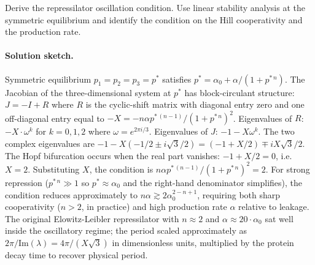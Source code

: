 \begin{exercise}
Derive the repressilator oscillation condition. Use linear stability
analysis at the symmetric equilibrium and identify the condition on
the Hill cooperativity and the production rate.

\paragraph{Solution sketch.}
Symmetric equilibrium $p_{1} = p_{2} = p_{3} = p^{*}$ satisfies
$p^{*} = \alpha_{0} + \alpha/(1 + p^{*\,n})$. The Jacobian of the
three-dimensional system at $p^{*}$ has block-circulant structure:
$J = -I + R$ where $R$ is the cyclic-shift matrix with diagonal
entry zero and one off-diagonal entry equal to
$-X = -n \alpha p^{*\,(n-1)}/(1 + p^{*\,n})^{2}$. Eigenvalues of
$R$: $-X \cdot \omega^{k}$ for $k = 0, 1, 2$ where
$\omega = e^{2\pi i/3}$. Eigenvalues of $J$: $-1 - X \omega^{k}$.
The two complex eigenvalues are $-1 - X(-1/2 \pm i\sqrt{3}/2) =
(-1 + X/2) \mp iX\sqrt{3}/2$. The Hopf bifurcation occurs when the
real part vanishes: $-1 + X/2 = 0$, i.e.\ $X = 2$. Substituting
$X$, the condition is $n \alpha p^{*\,(n-1)}/(1+p^{*\,n})^{2} = 2$.
For strong repression ($p^{*\,n} \gg 1$ so $p^{*} \approx \alpha_{0}$
and the right-hand denominator simplifies), the condition reduces
approximately to $n \alpha \gtrsim 2 \alpha_{0}^{2-n+1}$, requiring
both sharp cooperativity ($n > 2$, in practice) and high
production rate $\alpha$ relative to leakage. The original
Elowitz-Leibler repressilator with $n \approx 2$ and
$\alpha \approx 20 \cdot \alpha_{0}$ sat well inside the
oscillatory regime; the period scaled approximately as
$2 \pi / \mathrm{Im}(\lambda) = 4\pi/(X\sqrt{3})$ in
dimensionless units, multiplied by the protein decay time to
recover physical period.
\end{exercise}

